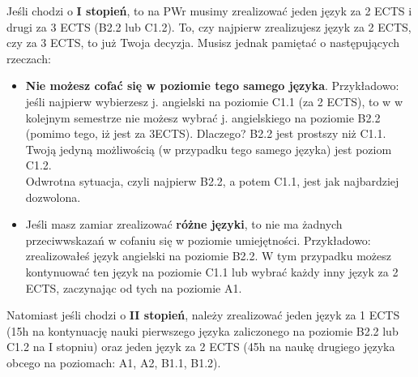 \documentclass[11pt]{article}
\begin{document}
\indent Jeśli chodzi o \textbf{I stopień}, to na PWr musimy zrealizować jeden język za 2 ECTS i drugi za 3 ECTS (B2.2 lub C1.2). To, czy najpierw zrealizujesz język za 2 ECTS, czy za 3 ECTS, to już Twoja decyzja. Musisz jednak pamiętać o następujących rzeczach: \\
\begin{itemize}
    \item \textbf{Nie możesz cofać się w poziomie tego samego języka}. Przykładowo: jeśli najpierw wybierzesz j. angielski na poziomie C1.1 (za 2 ECTS), to w w kolejnym semestrze nie możesz wybrać j. angielskiego na poziomie B2.2 (pomimo tego, iż jest za 3ECTS). Dlaczego? B2.2 jest prostszy niż C1.1. Twoją jedyną możliwością (w przypadku tego samego języka) jest poziom C1.2. \\
    Odwrotna sytuacja, czyli najpierw B2.2, a potem C1.1, jest jak najbardziej dozwolona.
    \item Jeśli masz zamiar zrealizować \textbf{różne języki}, to nie ma żadnych przeciwwskazań w cofaniu się w poziomie umiejętności. Przykładowo: zrealizowałeś język angielski na poziomie B2.2. W tym przypadku możesz kontynuować ten język na poziomie C1.1 lub wybrać każdy inny język za 2 ECTS, zaczynając od tych na poziomie A1.
    \end{itemize}
 \indent  Natomiast jeśli chodzi o \textbf{II stopień}, należy zrealizować jeden język za 1 ECTS (15h na kontynuację nauki pierwszego języka zaliczonego na poziomie B2.2 lub C1.2 na I stopniu) oraz jeden język za 2 ECTS (45h na naukę drugiego języka obcego na poziomach: A1, A2, B1.1, B1.2).\\
  
\end{document}
